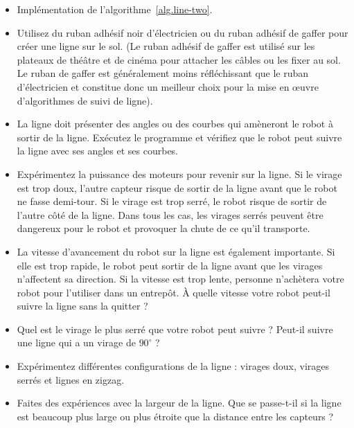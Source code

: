 {\begin{framed}
\begin{itemize}
\item Implémentation de l'algorithme~\ref{alg.line-two}.
\item Utilisez du ruban adhésif noir d'électricien ou du ruban adhésif de gaffer pour créer une ligne sur le sol. (Le ruban adhésif de gaffer est utilisé sur les plateaux de théâtre et de cinéma pour attacher les câbles ou les fixer au sol. Le ruban de gaffer est généralement moins réfléchissant que le ruban d'électricien et constitue donc un meilleur choix pour la mise en œuvre d'algorithmes de suivi de ligne).
\item La ligne doit présenter des angles ou des courbes qui amèneront le robot à sortir de la ligne. Exécutez le programme et vérifiez que le robot peut suivre la ligne avec ses angles et ses courbes.
\item Expérimentez la puissance des moteurs pour revenir sur la ligne. Si le virage est trop doux, l'autre capteur risque de sortir de la ligne avant que le robot ne fasse demi-tour. Si le virage est trop serré, le robot risque de sortir de l'autre côté de la ligne. Dans tous les cas, les virages serrés peuvent être dangereux pour le robot et provoquer la chute de ce qu'il transporte.
\item La vitesse d'avancement du robot sur la ligne est également importante. Si elle est trop rapide, le robot peut sortir de la ligne avant que les virages n'affectent sa direction. Si la vitesse est trop lente, personne n'achètera votre robot pour l'utiliser dans un entrepôt. À quelle vitesse votre robot peut-il suivre la ligne sans la quitter ?
\end{itemize}
\end{framed}

\begin{framed}
\begin{itemize}
\item Quel est le virage le plus serré que votre robot peut suivre ? Peut-il suivre une ligne qui a un virage de $90^\circ$ ?
\item Expérimentez différentes configurations de la ligne : virages doux, virages serrés et lignes en zigzag.
\item Faites des expériences avec la largeur de la ligne. Que se passe-t-il si la ligne est beaucoup plus large ou plus étroite que la distance entre les capteurs ?
\end{itemize}
\end{framed}

}
